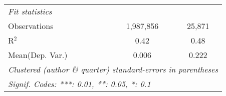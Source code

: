 \begin{tabular}{lcc}
   \midrule
   \emph{Fit statistics}\\
   Observations                                               & 1,987,856      & 25,871\\  
   R$^2$                                                      & 0.42           & 0.48\\  
Mean(Dep. Var.) & 0.006 & 0.222 \\
   \midrule \midrule
   \multicolumn{3}{l}{\emph{Clustered (author \& quarter) standard-errors in parentheses}}\\
   \multicolumn{3}{l}{\emph{Signif. Codes: ***: 0.01, **: 0.05, *: 0.1}}\\
\end{tabular}
\par\endgroup

